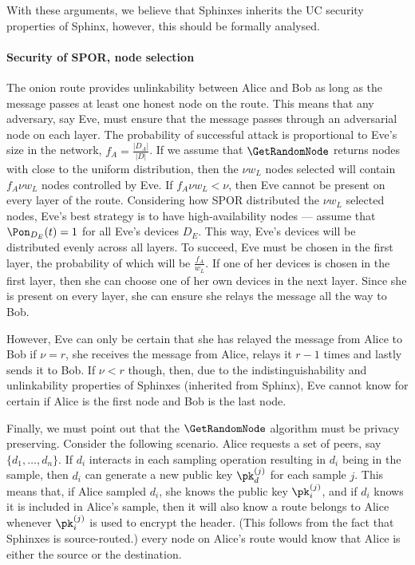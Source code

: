 With these arguments, we believe that Sphinxes inherits the \ac{UC} security 
properties of Sphinx, however, this should be formally analysed.

\paragraph*{Security of \acs*{SPOR}, node selection}

The onion route provides unlinkability between Alice and Bob as long as the 
message passes at least one honest node on the route.
This means that any adversary, say Eve,  must ensure that the message passes 
through an adversarial node on each layer.
The probability of successful attack is proportional to Eve's size in the 
network, \ie \(f_A = \frac{|D_A|}{|D|}\).
If we assume that \(\GetRandomNode\) returns nodes with close to the uniform 
distribution, then the \(\nu w_L\) nodes selected will contain \(f_A \nu w_L\) 
nodes controlled by Eve.
If \(f_A \nu w_L < \nu\), then Eve cannot be present on every layer of the 
route.
Considering how \ac{SPOR} distributed the \(\nu w_L\) selected nodes, Eve's 
best strategy is to have high-availability nodes --- assume that 
\(\Pon_{D_E}(t) = 1\) for all Eve's devices \(D_E\).
This way, Eve's devices will be distributed evenly across all layers.
To succeed, Eve must be chosen in the first layer, the probability of which 
will be \(\frac{f_A}{w_L}\).
If one of her devices is chosen in the first layer, then she can choose one of 
her own devices in the next layer.
Since she is present on every layer, she can ensure she relays the message all 
the way to Bob. 

However, Eve can only be certain that she has relayed the message from Alice to 
Bob if \(\nu = r\), \ie she receives the message from Alice, relays it \(r-1\) 
times and lastly sends it to Bob.
If \(\nu < r\) though, then, due to the indistinguishability and unlinkability 
properties of Sphinxes (inherited from Sphinx), Eve cannot know for certain if 
Alice is the first node and Bob is the last node. 


Finally, we must point out that the \(\GetRandomNode\) algorithm must be 
privacy preserving.
Consider the following scenario.
Alice requests a set of peers, say \(\{d_1, \dotsc, d_n\}\).
If \(d_i\) interacts in each sampling operation resulting in \(d_i\) being in 
the sample, then \(d_i\) can generate a new public key \(\pk_d^{(j)}\) for each 
sample \(j\).
This means that, if Alice sampled \(d_i\), she knows the public key 
\(\pk_i^{(j)}\), and if \(d_i\) knows it is included in Alice's sample, then it 
will also know a route belongs to Alice whenever \(\pk_i^{(j)}\) is used to 
encrypt the header.
(This follows from the fact that Sphinxes is source-routed.)
\Ie every node on Alice's route would know that Alice is either the source or 
the destination.

